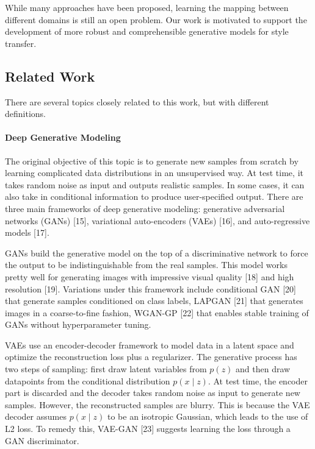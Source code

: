 \documentclass{article}
\begin{document}
While many approaches have been proposed, learning the mapping between different domains is still an open problem. Our work is motivated to support the development of more robust and comprehensible generative models for style transfer.


\subsection{Related Work}
There are several topics closely related to this work, but with different definitions.

\paragraph{Deep Generative Modeling}
The original objective of this topic is to generate new samples from scratch by learning complicated data distributions in an unsupervised way. At test time, it takes random noise as input and outputs realistic samples. In some cases, it can also take in conditional information to produce user-specified output. There are three main frameworks of deep generative modeling: generative adversarial networks (GANs) [15], variational auto-encoders (VAEs) [16], and auto-regressive models [17].

GANs build the generative model on the top of a discriminative network to force the output to be indistinguishable from the real samples. This model works pretty well for generating images with impressive visual quality [18] and high resolution [19]. Variations under this framework include conditional GAN [20] that generate samples conditioned on class labels, LAPGAN [21] that generates images in a coarse-to-fine fashion, WGAN-GP [22] that enables stable training of GANs without hyperparameter tuning.

VAEs use an encoder-decoder framework to model data in a latent space and optimize the reconstruction loss plus a regularizer. The generative process has two steps of sampling: first draw latent variables from $p(z)$ and then draw datapoints from the conditional distribution $p(x\mid z)$. At test time, the encoder part is discarded and the decoder takes random noise as input to generate new samples. However, the reconstructed samples are blurry. This is because the VAE decoder assumes $p(x\mid z)$ to be an isotropic Gaussian, which leads to the use of L2 loss. To remedy this, VAE-GAN [23] suggests learning the loss through a GAN discriminator.
\end{document}
